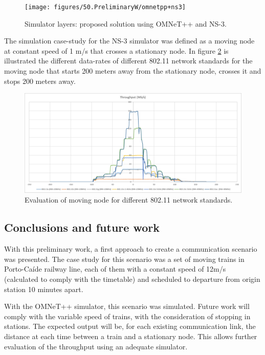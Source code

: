 \begin{figure}[h!]
	\centering
	\texttt{[image: figures/50.PreliminaryW/omnetpp+ns3]}
	\caption{Simulator layers: proposed solution using OMNeT++ and NS-3.}
	\label{fig:5.omnetpp+ns3}
\end{figure}

The simulation case-study for the NS-3 simulator was defined as a moving node at constant speed of 1 m/s that crosses a stationary node. In figure \ref{fig:5.distance-rate} is illustrated the different data-rates of different  802.11 network standards for the moving node that starts 200 meters away from the stationary node, crosses it and stops 200 meters away.

\begin{figure}[h!]
	\centering
	\includegraphics[width=\textwidth,keepaspectratio]{figures/50.PreliminaryW/distance-rate}
	\caption{Evaluation of moving node for different 802.11 network standards.}
	\label{fig:5.distance-rate}
\end{figure}


\subsection{Conclusions and future work}

	With this preliminary work, a first approach to create a communication scenario was presented. 
	The case study for this scenario was a set of moving trains in Porto-Caíde railway line, each of them with a constant speed of 12m/s (calculated to comply with the timetable) and scheduled to departure from origin station 10 minutes apart.
	
	With the OMNeT++ simulator, this scenario was simulated. Future work will comply with the variable speed of trains, with the consideration of stopping in stations. The expected output will be, for each existing communication link, the distance at each time between a train and a stationary node. This allows further evaluation of the throughput using an adequate simulator.
	
